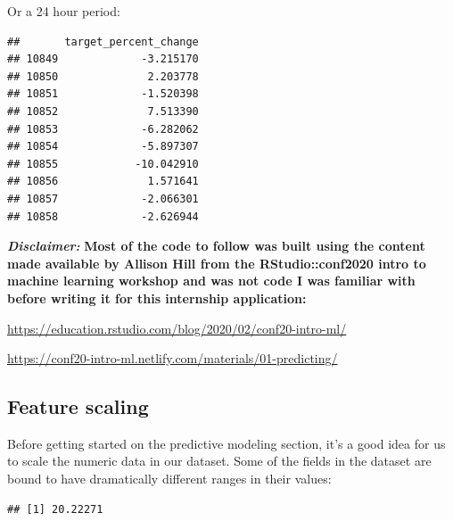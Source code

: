 \documentclass[
]{book}
\newenvironment{Shaded}{\begin{snugshade}}{\end{snugshade}}
\newcommand{\DataTypeTok}[1]{\textcolor[rgb]{0.13,0.29,0.53}{#1}}
\newcommand{\DecValTok}[1]{\textcolor[rgb]{0.00,0.00,0.81}{#1}}
\newcommand{\KeywordTok}[1]{\textcolor[rgb]{0.13,0.29,0.53}{\textbf{#1}}}
\newcommand{\NormalTok}[1]{#1}
\newcommand{\OperatorTok}[1]{\textcolor[rgb]{0.81,0.36,0.00}{\textbf{#1}}}
\newcommand{\StringTok}[1]{\textcolor[rgb]{0.31,0.60,0.02}{#1}}
\begin{document}
Or a 24 hour period:

\begin{Shaded}
\end{Shaded}

\begin{verbatim}
##       target_percent_change
## 10849             -3.215170
## 10850              2.203778
## 10851             -1.520398
## 10852              7.513390
## 10853             -6.282062
## 10854             -5.897307
## 10855            -10.042910
## 10856              1.571641
## 10857             -2.066301
## 10858             -2.626944
\end{verbatim}

\textbf{\emph{Disclaimer:}} \textbf{Most of the code to follow was built using the content made available by Allison Hill from the RStudio::conf2020 intro to machine learning workshop and was not code I was familiar with before writing it for this internship application:}

\url{https://education.rstudio.com/blog/2020/02/conf20-intro-ml/}

\url{https://conf20-intro-ml.netlify.com/materials/01-predicting/}

\hypertarget{feature-scaling}{%
\subsection{Feature scaling}\label{feature-scaling}}

Before getting started on the predictive modeling section, it's a good idea for us to scale the numeric data in our dataset. Some of the fields in the dataset are bound to have dramatically different ranges in their values:

\begin{Shaded}
\end{Shaded}

\begin{verbatim}
## [1] 20.22271
\end{verbatim}
\end{document}
